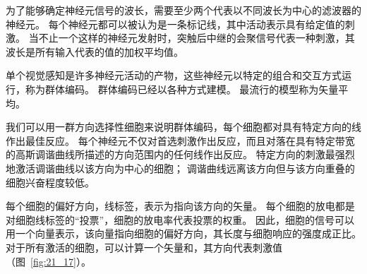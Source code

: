 为了能够确定神经元信号的波长，需要至少两个代表以不同波长为中心的滤波器的神经元。 
每个神经元都可以被认为是一条标记线，其中活动表示具有给定值的刺激。 
当不止一个这样的神经元发射时，突触后中继的会聚信号代表一种刺激，其波长是所有输入代表的值的加权平均值。


单个视觉感知是许多神经元活动的产物，这些神经元以特定的组合和交互方式运行，称为群体编码。 
群体编码已经以各种方式建模。 
最流行的模型称为矢量平均。


我们可以用一群方向选择性细胞来说明群体编码，每个细胞都对具有特定方向的线作出最佳反应。 
每个神经元不仅对首选刺激作出反应，而且对落在具有特定带宽的高斯调谐曲线所描述的方向范围内的任何线作出反应。 
特定方向的刺激最强烈地激活调谐曲线以该方向为中心的细胞； 
调谐曲线远离该方向但与该方向重叠的细胞兴奋程度较低。


每个细胞的偏好方向，线标签，表示为指向该方向的矢量。
每个细胞的放电都是对细胞线标签的“投票”，细胞的放电率代表投票的权重。
因此，细胞的信号可以用一个向量表示，该向量指向细胞的偏好方向，其长度与细胞响应的强度成正比。
对于所有激活的细胞，可以计算一个矢量和，其方向代表刺激值（图~\ref{fig:21_17}）。


